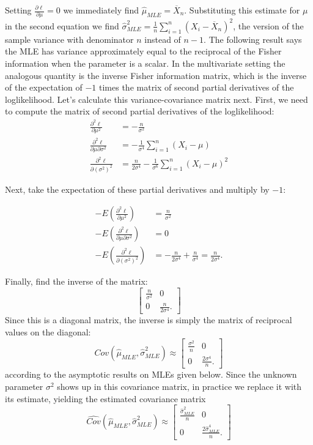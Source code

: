 \documentclass[]{book}
\begin{document}
Setting \(\frac{\partial\ell}{\partial \mu}=0\) we immediately find
\(\hat\mu_{MLE} = \overline X_n\). Substituting this estimate for
\(\mu\) in the second equation we find
\(\hat\sigma^2_{MLE} = \frac{1}{n}\sum_{i=1}^n (X_i-\overline X_n)^2\),
the version of the sample variance with denominator \(n\) instead of
\(n-1\). The following result says the MLE has variance approximately
equal to the reciprocal of the Fisher information when the parameter is
a scalar. In the multivariate setting the analogous quantity is the
inverse Fisher information matrix, which is the inverse of the
expectation of \(-1\) times the matrix of second partial derivatives of
the loglikelihood. Let's calculate this variance-covariance matrix next.
First, we need to compute the matrix of second partial derivatives of
the loglikelihood:\\

\begin{align*}
\frac{\partial^2\ell}{\partial \mu^2} &= -\frac{n}{\sigma^2}\\
\frac{\partial^2\ell}{\partial \mu\partial\sigma^2} &= -\frac{1}{\sigma^4}\sum_{i=1}^n (X_i-\mu)\\
\frac{\partial^2\ell}{\partial (\sigma^2)^2} &= \frac{n}{2\sigma^4} - \frac{1}{\sigma^6}\sum_{i=1}^n (X_i-\mu)^2
\end{align*}

Next, take the expectation of these partial derivatives and multiply by
\(-1\):

\begin{align*}
-E(\frac{\partial^2\ell}{\partial \mu^2}) &= \frac{n}{\sigma^2}\\
-E(\frac{\partial^2\ell}{\partial \mu\partial\sigma^2}) &= 0\\
-E(\frac{\partial^2\ell}{\partial (\sigma^2)^2}) &= -\frac{n}{2\sigma^4} + \frac{n}{\sigma^4} = \frac{n}{2\sigma^4}.
\end{align*}

Finally, find the inverse of the matrix: \[\begin{bmatrix}
\frac{n}{\sigma^2} &0 \\
0 &\frac{n}{2\sigma^4}.
\end{bmatrix}\] Since this is a diagonal matrix, the inverse is simply
the matrix of reciprocal values on the diagonal:
\[Cov(\hat\mu_{MLE}, \hat\sigma^2_{MLE}) \approx \begin{bmatrix}
\frac{\sigma^2}{n} &0 \\
0 &\frac{2\sigma^4}{n}.
\end{bmatrix}\] according to the asymptotic results on MLEs given below.
Since the unknown parameter \(\sigma^2\) shows up in this covariance
matrix, in practice we replace it with its estimate, yielding the
estimated covariance matrix
\[\widehat {Cov}(\hat\mu_{MLE}, \hat\sigma^2_{MLE}) \approx \begin{bmatrix}
\frac{\hat\sigma_{MLE}^2}{n} &0 \\
0 &\frac{2\hat\sigma_{MLE}^4}{n}.
\end{bmatrix}\]
\end{document}

